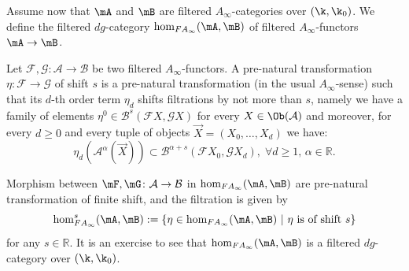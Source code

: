 Assume now that $\mA$ and $\mB$ are filtered $A_\infty$-categories over $(\k,\k_0)$. We define the filtered $dg$-category $\hom_{FA_\infty}(\mA,\mB)$ of filtered $A_\infty$-functors $\mA\to \mB$.
\begin{dfn}
   Let $\mathcal{F}, \mathcal{G}: \mathcal{A} \longrightarrow \mathcal{B}$ be
two filtered $A_{\infty}$-functors. A pre-natural transformation
$\eta: \mathcal{F} \longrightarrow \mathcal{G}$ of shift $s$ is a
pre-natural transformation (in the usual $A_{\infty}$-sense) such that
its $d$-th order term $\eta_d$ shifts filtrations by not more than $s$, namely we have
a family of elements
$\eta^0 \in \mathcal{B}^{s}(\mathcal{F} X, \mathcal{G}X)$ for every
$X \in \Ob(\mathcal{A})$ and moreover, for every $d \geq 0$ and every
tuple of objects $\vec{X} = (X_0, \ldots, X_d)$ we have:
$$\eta_d (\mathcal{A}^{\alpha}(\vec{X})) \subset
\mathcal{B}^{\alpha + s}(\mathcal{F}X_0, \mathcal{G}X_d), \; \forall d
\geq 1, \, \alpha \in \mathbb{R}.$$
\end{dfn}
Morphism between $\mF,\mG\colon \mathcal{A}\to \mathcal{B}$ in $\hom_{FA_\infty}(\mA,\mB)$ are pre-natural transformation of finite shift, and the filtration is given by $$\hom^s_{FA_\infty}(\mA,\mB):=\left\{\eta \in \hom_{FA_\infty}(\mA,\mB) \ \vert \ \eta \text{ is of shift }s\right\}$$ for any $s\in \mathbb{R}$. It is an exercise to see that $\hom_{FA_\infty}(\mA,\mB)$ is a filtered $dg$-category over $(\k,\k_0)$.

